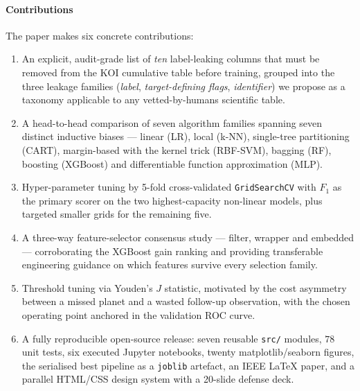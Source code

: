 \documentclass[conference]{IEEEtran}
\begin{document}
\paragraph*{Contributions} The paper makes six concrete
contributions:
\begin{enumerate}
  \item An explicit, audit-grade list of \emph{ten} label-leaking
        columns that must be removed from the KOI cumulative table
        before training, grouped into the three leakage families
        (\emph{label}, \emph{target-defining flags}, \emph{identifier})
        we propose as a taxonomy applicable to any vetted-by-humans
        scientific table.
  \item A head-to-head comparison of seven algorithm families
        spanning seven distinct inductive biases --- linear (LR),
        local (k-NN), single-tree partitioning (CART),
        margin-based with the kernel trick (RBF-SVM),
        bagging (RF), boosting (XGBoost) and
        differentiable function approximation (MLP).
  \item Hyper-parameter tuning by 5-fold cross-validated
        \texttt{GridSearchCV} with $F_1$ as the primary scorer on
        the two highest-capacity non-linear models, plus targeted
        smaller grids for the remaining five.
  \item A three-way feature-selector consensus study --- filter,
        wrapper and embedded --- corroborating the XGBoost gain
        ranking and providing transferable engineering guidance on
        which features survive every selection family.
  \item Threshold tuning via Youden's $J$ statistic, motivated by
        the cost asymmetry between a missed planet and a wasted
        follow-up observation, with the chosen operating point
        anchored in the validation ROC curve.
  \item A fully reproducible open-source release: seven reusable
        \texttt{src/} modules, $78$ unit tests, six executed
        Jupyter notebooks, twenty matplotlib/seaborn figures, the
        serialised best pipeline as a \texttt{joblib} artefact, an
        IEEE LaTeX paper, and a parallel HTML/CSS design system
        with a 20-slide defense deck.
\end{enumerate}
\end{document}
